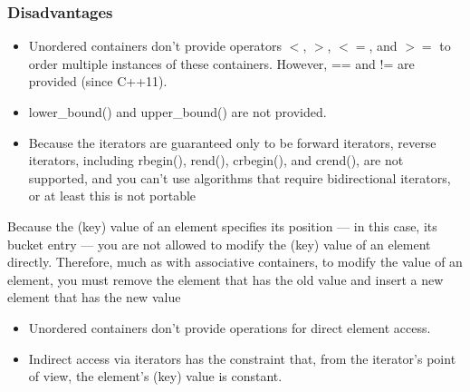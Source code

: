 \documentclass{report}
\begin{document}
\bigbreak \noindent 
\subsubsection{Disadvantages}
\begin{itemize}
    \item Unordered containers don’t provide operators $<$, $>$, $<=$, and $>=$ to order multiple instances of these containers. However, == and != are provided (since C++11).
    \item lower\_bound() and upper\_bound() are not provided.
    \item Because the iterators are guaranteed only to be forward iterators, reverse iterators, including rbegin(), rend(), crbegin(), and crend(), are not supported, and you can’t use algorithms that require bidirectional iterators, or at least this is not portable
\end{itemize}
\bigbreak \noindent 
Because the (key) value of an element specifies its position — in this case, its bucket entry — you
are not allowed to modify the (key) value of an element directly. Therefore, much as with associative
containers, to modify the value of an element, you must remove the element that has the old value
and insert a new element that has the new value
\bigbreak \noindent 
\begin{itemize}
    \item Unordered containers don’t provide operations for direct element access.
    \item Indirect access via iterators has the constraint that, from the iterator’s point of view, the element’s (key) value is constant.
\end{itemize}

   \pagebreak 
\end{document}
